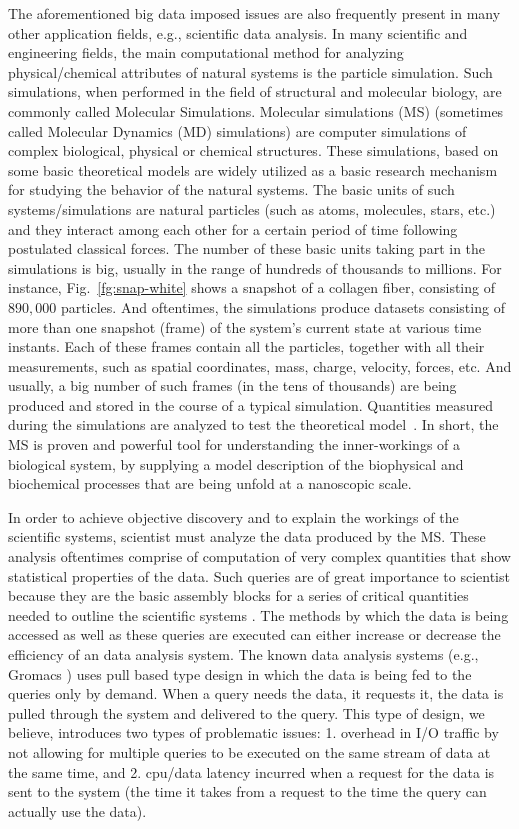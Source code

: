 \documentclass[10pt,journal,final,letterpaper,twocolumn]{IEEEtran}
\begin{document}
The aforementioned big data imposed issues are also frequently
present in many other application fields, e.g., scientific data
analysis. In many scientific and engineering fields, the main
computational method for analyzing physical/chemical attributes of
natural systems is the particle simulation. Such simulations, when
performed in the field of structural and molecular biology, are
commonly called Molecular Simulations. Molecular simulations (MS)
(sometimes called Molecular Dynamics (MD) simulations) are computer
simulations of complex biological, physical or chemical structures.
These simulations, based on some basic theoretical models are widely
utilized as a basic research mechanism for studying the behavior of
the natural systems. The basic units of such systems/simulations are
natural particles (such as atoms, molecules, stars, etc.) and they
interact among each other for a certain period of time following
postulated classical forces. The number of these basic units taking
part in the simulations is big, usually in the range of hundreds of
thousands to millions. For instance, Fig.~\ref{fg:snap-white} shows
a snapshot of a collagen fiber, consisting of $890,000$ particles.
And oftentimes, the simulations produce datasets consisting of more
than one snapshot (frame) of the system's current state at various
time instants. Each of these frames contain all the particles,
together with all their measurements, such as spatial coordinates,
mass, charge, velocity, forces, etc. And usually, a big number of
such frames (in the tens of thousands) are being produced and stored
in the course of a typical simulation. Quantities measured during
the simulations are analyzed to test the theoretical
model~\cite{Frenkel:api01,Landau:cup05}. In short, the MS is proven
and powerful tool for understanding the inner-workings of a
biological system, by supplying a model description of the
biophysical and biochemical processes that are being unfold at a
nanoscopic scale.

In order to achieve objective discovery and to explain the workings
of the scientific systems, scientist must analyze the data produced
by the MS. These analysis oftentimes comprise of computation of very
complex quantities that show statistical properties of the data.
Such queries are of great importance to scientist because they are
the basic assembly blocks for a series of critical quantities needed
to outline the scientific systems \cite{Frenkel:api01}. The methods
by which the data is being accessed as well as these queries are
executed can either increase or decrease the efficiency of an data
analysis system. The known data analysis systems (e.g., Gromacs
\cite{Gromacs-online}) uses pull based type design in which the data
is being fed to the queries only by demand. When a query needs the
data, it requests it, the data is pulled through the system and
delivered to the query. This type of design, we believe, introduces
two types of problematic issues: 1. overhead in I/O traffic by not
allowing for multiple queries to be executed on the same stream of
data at the same time, and 2. cpu/data latency incurred when a
request for the data is sent to the system (the time it takes from a
request to the time the query can actually use the data).
\end{document}
